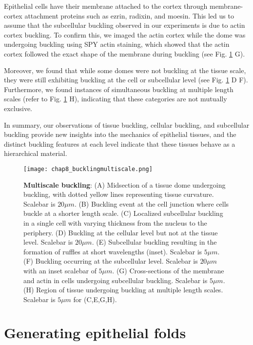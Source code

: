 Epithelial cells have their membrane attached to the cortex through membrane-cortex attachment proteins such as ezrin, radixin, and moesin. This led us to assume that the subcellular buckling observed in our experiments is due to actin cortex buckling. To confirm this, we imaged the actin cortex while the dome was undergoing buckling using SPY actin staining, which showed that the actin cortex followed the exact shape of the membrane during buckling (see Fig. \ref{fig_8_4} G).

Moreover, we found that while some domes were not buckling at the tissue scale, they were still exhibiting buckling at the cell or subcellular level (see Fig.  \ref{fig_8_4} D F). Furthermore, we found instances of simultaneous buckling at multiple length scales (refer to Fig. \ref{fig_8_4} H), indicating that these categories are not mutually exclusive.

In summary, our observations of tissue buckling, cellular buckling, and subcellular buckling provide new insights into the mechanics of epithelial tissues, and the distinct buckling features at each level indicate that these tissues behave as a hierarchical material.

\begin{figure}[]
	\centering
	\texttt{[image: chap8\_bucklingmultiscale.png]}
	\caption{\label{fig_8_4} \textbf{Multiscale buckling}: (A) Midsection of a tissue dome undergoing buckling, with dotted yellow lines representing tissue curvature. Scalebar is $20\mu m$. (B) Buckling event at the cell junction where cells buckle at a shorter length scale. (C) Localized subcellular buckling in a single cell with varying thickness from the nucleus to the periphery. (D) Buckling at the cellular level but not at the tissue level. Scalebar is $20\mu m$. (E) Subcellular buckling resulting in the formation of ruffles at short wavelengths (inset). Scalebar is $5 \mu m$. (F) Buckling occurring at the subcellular level. Scalebar is $20\mu m$ with an inset scalebar of $5 \mu m$. (G) Cross-sections of the membrane and actin in cells undergoing subcellular buckling. Scalebar is $5\mu m$. (H) Region of tissue undergoing buckling at multiple length scales. Scalebar is $5\mu m$ for (C,E,G,H).}
\end{figure}

\hypertarget{generating-epithelial-folds}{%
	\section{Generating epithelial
		folds}\label{generating-epithelial-folds}}

